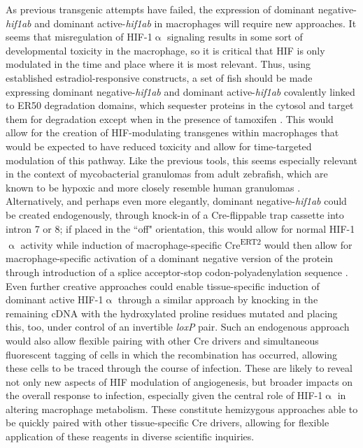 As previous transgenic attempts have failed, the expression of dominant negative\hyp{}\textit{hif1ab} and dominant active\hyp{}\textit{hif1ab} in macrophages will require new approaches. It seems that misregulation of HIF\hyp{}1$\upalpha$ signaling results in some sort of developmental toxicity in the macrophage, so it is critical that HIF is only modulated in the time and place where it is most relevant. Thus, using established estradiol\hyp{}responsive constructs, a set of fish should be made expressing dominant negative\hyp{}\textit{hif1ab} and dominant active\hyp{}\textit{hif1ab} covalently linked to ER50 degradation domains, which sequester proteins in the cytosol and target them for degradation except when in the presence of tamoxifen \citep{Miyazaki2012}. This would allow for the creation of HIF\hyp{}modulating transgenes within macrophages that would be expected to have reduced toxicity and allow for time\hyp{}targeted modulation of this pathway. Like the previous tools, this seems especially relevant in the context of mycobacterial granulomas from adult zebrafish, which are known to be hypoxic and more closely resemble human granulomas \citep{Harper2012, Oehlers2015, Rustad2009}. Alternatively, and perhaps even more elegantly, dominant negative\hyp{}\textit{hif1ab} could be created endogenously, through knock\hyp{}in of a Cre\hyp{}flippable trap cassette into intron 7 or 8; if placed in the ``off" orientation, this would allow for normal HIF\hyp{}1$\upalpha$ activity while induction of macrophage\hyp{}specific Cre\textsuperscript{ERT2} would then allow for macrophage\hyp{}specific activation of a dominant negative version of the protein through introduction of a splice acceptor\hyp{}stop codon\hyp{}polyadenylation sequence \citep{Ni2012}. Even further creative approaches could enable tissue\hyp{}specific induction of dominant active HIF\hyp{}1$\upalpha$ through a similar approach by knocking in the remaining cDNA with the hydroxylated proline residues mutated and placing this, too, under control of an invertible \textit{loxP} pair. Such an endogenous approach would also allow flexible pairing with other Cre drivers and simultaneous fluorescent tagging of cells in which the recombination has occurred, allowing these cells to be traced through the course of infection. These are likely to reveal not only new aspects of HIF modulation of angiogenesis, but broader impacts on the overall response to infection, especially given the central role of HIF\hyp{}1$\upalpha$ in altering macrophage metabolism. These constitute hemizygous approaches able to be quickly paired with other tissue-specific Cre drivers, allowing for flexible application of these reagents in diverse scientific inquiries.

